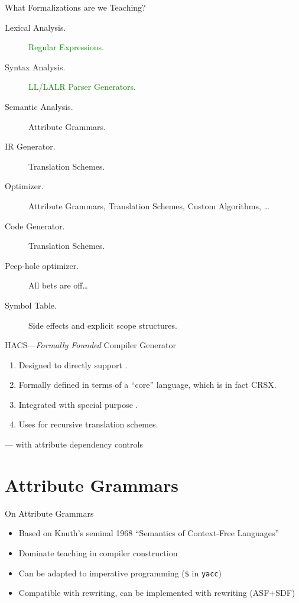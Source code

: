 \documentclass[pdftex,aspectratio=169,14pt]{beamer}
\begin{document}
\begin{frame}{What Formalizations are we Teaching?}
  \begin{description}
  \item[Lexical Analysis.] \textcolor{green}{Regular Expressions.}\pause
  \item[Syntax Analysis.] \textcolor{green}{LL/LALR Parser Generators.}\pause
  \item[Semantic Analysis.] \alert{Attribute Grammars.}\pause
  \item[IR Generator.] \alert{Translation Schemes.}\pause
  \item[Optimizer.] \alert{Attribute Grammars, Translation Schemes, Custom Algorithms, \dots}\pause
  \item[Code Generator.] \alert{Translation Schemes.}\pause
  \item[Peep-hole optimizer.] \alert{All bets are off\dots}\pause\\[1em]

  \item[Symbol Table.] \alert{Side effects and explicit scope structures.}
  \end{description}
\end{frame}

\begin{frame}{HACS---\emph{Formally Founded} Compiler Generator}
  \begin{enumerate}
  \item Designed to directly support .
  \item Formally defined in terms of a ``core'' language, which is in fact CRSX.
  \item Integrated with special purpose .
  \item Uses  for recursive translation schemes.
  \end{enumerate}
  \pause
  \vspace*{1em}
  \alert{--- with attribute dependency controls}
\end{frame}


\section{Attribute Grammars}
\frame{\tableofcontents[current]}

\begin{frame}{On Attribute Grammars}
  \begin{itemize}
  \item Based on Knuth's seminal 1968 ``Semantics of Context-Free Languages''
  \item Dominate teaching in compiler construction
  \item Can be adapted to imperative programming (\texttt{\$} in \texttt{yacc})
  \item Compatible with rewriting, can be implemented with rewriting (ASF+SDF)
  \end{itemize}
\end{frame}
\end{document}
